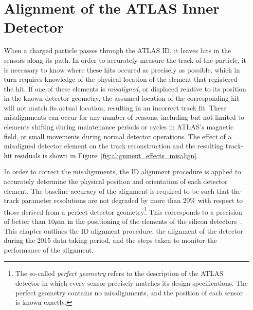 \chapter[Alignment of the ATLAS Inner Detector][Alignment of the ATLAS Inner Detector]{Alignment of the ATLAS Inner Detector}
\label{ch:alignment}

When a charged particle passes through the ATLAS ID, it leaves hits in the sensors along its path.
In order to accurately measure the track of the particle, it is necessary to know where these hits occured as precisely as possible, which in turn requires knowledge of the physical location of the element that registered the hit.
If one of these elements is \emph{misaligned}, or displaced relative to its position in the known detector geometry, the assumed location of the corresponding hit will not match its actual location, resulting in an incorrect track fit.
These misalignments can occur for any number of reasons, including but not limited to elements shifting during maintenance periods or cycles in ATLAS's magnetic field, or small movements during normal detector operations.
The effect of a misaligned detector element on the track reconstruction and the resulting track-hit residuals is shown in Figure~\ref{fig:alignment_effects_misalign}. 

In order to correct the misalignments, the ID alignment procedure is applied to accurately determine the physical position and orientation of each detector element.
The baseline accuracy of the alignment is required to be such that the track parameter resolutions are not degraded by more than 20\% with respect to those derived from a perfect detector geometry\footnote{The so-called \emph{perfect geometry} refers to the description of the ATLAS detector in which every sensor precisely matches its design specifications.  The perfect geometry contains no misalignments, and the position of each sensor is known exactly.}
This corresponds to a precision of better than $10\mu\textrm{m}$ in the positioning of the elements of the silicon detectors~\cite{TDR-ID1}.
This chapter outlines the ID alignment procedure, the alignment of the detector during the 2015 data taking period, and the steps taken to monitor the performance of the alignment.  

